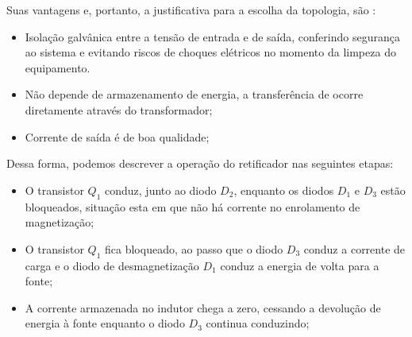 Suas vantagens e, portanto, a justificativa para a escolha da topologia, são \cite{Conversores}:

\begin{itemize}
    \item Isolação galvânica entre a tensão de entrada e de saída, conferindo segurança ao sistema e evitando riscos de choques elétricos no momento da limpeza do equipamento. 
    
    \item Não depende de armazenamento de energia, a transferência de ocorre diretamente através do transformador;
    
    \item Corrente de saída é de boa qualidade;
    
\end{itemize}

Dessa forma, podemos descrever a operação do retificador nas seguintes etapas:

\begin{itemize}
    \item  O transistor $Q_{1}$ conduz, junto ao diodo $D_{2}$, enquanto os diodos $D_{1}$ e $D_{3}$ estão bloqueados, situação esta em que não há corrente no enrolamento de magnetização;
    
    \item O transistor $Q_{1}$ fica bloqueado, ao passo que o diodo $D_{3}$ conduz a corrente de carga e o diodo de desmagnetização $D_{1}$ conduz a energia de volta para a fonte;
    
    \item  A corrente armazenada no indutor chega a zero, cessando a devolução de energia à fonte enquanto o diodo $D_{3}$ continua conduzindo; 
    
\end{itemize}

